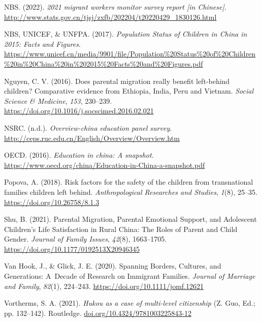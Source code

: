 \documentclass[
  man,floatsintext]{apa7}
\newlength{\cslhangindent}
\newlength{\cslentryspacingunit} %
\newenvironment{CSLReferences}[2] %
 {%
  \setlength{\parindent}{0pt}
  \ifodd #1
  \let\oldpar\par
  \def\par{\hangindent=\cslhangindent\oldpar}
  \fi
  \setlength{\parskip}{#2\cslentryspacingunit}
 }%
 {}
\begin{document}
\begin{CSLReferences}{1}{0}
\leavevmode{}%
NBS. (2022). \emph{2021 migrant workers monitor survey report {[}in Chinese{]}}. \url{http://www.stats.gov.cn/tjsj/zxfb/202204/t20220429_1830126.html}

\leavevmode{}%
NBS, UNICEF, \& UNFPA. (2017). \emph{Population Status of Children in China in 2015: Facts and Figures}. \url{https://www.unicef.cn/media/9901/file/Population\%20Status\%20of\%20Children\%20in\%20China\%20in\%202015\%20Facts\%20and\%20Figures.pdf}

\leavevmode{}%
Nguyen, C. V. (2016). Does parental migration really benefit left-behind children? Comparative evidence from Ethiopia, India, Peru and Vietnam. \emph{Social Science \& Medicine}, \emph{153}, 230--239. \url{https://doi.org/10.1016/j.socscimed.2016.02.021}

\leavevmode{}%
NSRC. (n.d.). \emph{Overview-china education panel survey}. \url{http://ceps.ruc.edu.cn/English/Overview/Overview.htm}

\leavevmode{}%
OECD. (2016). \emph{Education in china: A snapshot}. \url{https://www.oecd.org/china/Education-in-China-a-snapshot.pdf}

\leavevmode{}%
Popova, A. (2018). Risk factors for the safety of the children from transnational families children left behind. \emph{Anthropological Researches and Studies}, \emph{1}(8), 25--35. \url{https://doi.org/10.26758/8.1.3}

\leavevmode{}%
Shu, B. (2021). Parental Migration, Parental Emotional Support, and Adolescent Children{'}s Life Satisfaction in Rural China: The Roles of Parent and Child Gender. \emph{Journal of Family Issues}, \emph{42}(8), 1663--1705. \url{https://doi.org/10.1177/0192513X20946345}

\leavevmode{}%
Van Hook, J., \& Glick, J. E. (2020). Spanning Borders, Cultures, and Generations: A~Decade of Research on Immigrant Families. \emph{Journal of Marriage and Family}, \emph{82}(1), 224--243. \url{https://doi.org/10.1111/jomf.12621}

\leavevmode{}%
Vortherms, S. A. (2021). \emph{Hukou as a case of multi-level citizenship} (Z. Guo, Ed.; pp. 132--142). Routledge. \href{https://doi.org/10.4324/9781003225843-12}{doi.org/10.4324/9781003225843-12}


\end{CSLReferences}
\end{document}
